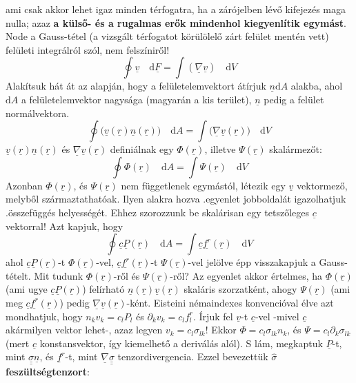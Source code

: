\documentclass[a4paper, 12pt, titlepage]{article}
\begin{document}
ami csak akkor lehet igaz minden térfogatra, ha a zárójelben lévő kifejezés maga nulla; azaz \textbf{a külső- és a rugalmas erők mindenhol kiegyenlítik egymást}. %
\newline
Node a Gauss-tétel (a vizsgált térfogatot körülölelő zárt felület mentén vett) felületi integrálról szól, nem felszíniről!
\[\oint\underline{v}\quad\mathrm{d}\underline{F}=\int(\underline{\nabla}\underline{v})\quad\mathrm{d}V\]
Alakítsuk hát át az alapján, hogy a felületelemvektort átírjuk $\underline{n}\mathrm{d}A$ alakba, ahol $\mathrm{d}A$ a felületelemvektor nagysága (magyarán a kis terület), $\underline{n}$ pedig a felület normálvektora.
\[\oint\bigg(\underline{v}(\underline{r})\underline{n}(\underline{r})\bigg)\quad\mathrm{d}A=\int\bigg(\underline{\nabla}\underline{v}(\underline{r})\bigg)\quad\mathrm{d}V\]
$\underline{v}(\underline{r})\underline{n}(\underline{r})$ és $\underline{\nabla}\underline{v}(\underline{r})$ definiálnak egy $\Phi(\underline{r})$, illetve $\Psi(\underline{r})$ skalármezőt:
\[\oint\Phi(\underline{r})\quad\mathrm{d}A=\int\Psi(\underline{r})\quad\mathrm{d}V\]
Azonban $\Phi(\underline{r})$, és $\Psi(\underline{r})$ nem függetlenek egymástól, létezik egy $\underline{v}$ vektormező, melyből származtathatóak. %
\newline
Ilyen alakra hozva .\hspace{1mm}egyenlet jobboldalát igazolhatjuk .\hspace{1mm}összefüggés helyességét. Ehhez szorozzunk be skalárisan egy tetszőleges $\underline{c}$ vektorral! Azt kapjuk, hogy
\[\oint\underline{c}\underline{P}(\underline{r})\quad\mathrm{d}A=\int\underline{c}\underline{f^{r}}(\underline{r})\quad\mathrm{d}V\]
ahol $\underline{c}\underline{P}(\underline{r})$-t $\Phi(\underline{r})$-vel, $\underline{c}\underline{f^{r}}(\underline{r})$-t $\Psi(\underline{r})$-vel jelölve épp visszakapjuk a Gauss-tételt.
\newline
Mit tudunk $\Phi(\underline{r})$-ről és $\Psi(\underline{r})$-ről?
\newline
Az egyenlet akkor értelmes, ha $\Phi(\underline{r})$ (ami ugye $\underline{c}\underline{P}(\underline{r})$) felírható $\underline{n}(\underline{r})\underline{v}(\underline{r})$ skaláris szorzatként, ahogy $\Psi(\underline{r})$ (ami meg $\underline{c}\underline{f^{r}}(\underline{r})$) pedig $\underline{\nabla}\underline{v}(\underline{r})$-ként. Eisteini némaindexes konvencióval élve azt mondhatjuk, hogy $n_{k}v_{k}=c_{l}P_{l}$ és $\partial_{k}v_{k}=c_{l}f^{r}_{l}$. Írjuk fel $\underline{v}$-t $\underline{c}$-vel -mivel $\underline{c}$ akármilyen vektor lehet-, azaz legyen $v_{k}=c_{l}\sigma_{lk}$! Ekkor $\Phi=c_{l}\sigma_{lk}n_{k}$, és $\Psi=c_{l}\partial_{k}\sigma_{lk}$ (mert $\underline{c}$ konstansvektor, így kiemelhető a deriválás alól). S lám, megkaptuk $\underline{P}$-t, mint $\underline{\underline{\sigma}}\underline{n}$, és $\underline{f}^{r}$-t, mint $\underline{\nabla}\underline{\underline{\sigma}}$ tenzordivergencia. Ezzel bevezettük $\hat{\sigma}$ \textbf{feszültségtenzort}:
\end{document}
